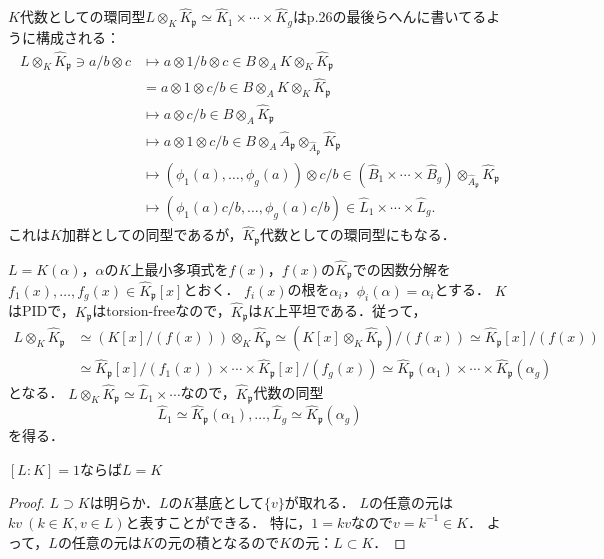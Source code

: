 $K$代数としての環同型$L\otimes_K\widehat{K}_\mathfrak{p}\simeq\widehat{K}_1\times\cdots\times\widehat{K}_g$はp.26の最後らへんに書いてるように構成される：
\begin{align*}
  L\otimes_K\widehat{K}_\mathfrak{p}\ni a/b\otimes c &\mapsto a\otimes1/b\otimes c\in B\otimes_AK\otimes_K\widehat{K}_\mathfrak{p}\\
  & =  a\otimes1\otimes c/b\in B\otimes_AK\otimes_K\widehat{K}_\mathfrak{p}\\
  &\mapsto a\otimes c/b\in B\otimes_A\widehat{K}_\mathfrak{p}\\
  &\mapsto a\otimes1\otimes c/b\in B\otimes_A\widehat{A}_\mathfrak{p}\otimes_{\widehat{A}_\mathfrak{p}}\widehat{K}_\mathfrak{p}\\
  &\mapsto (\phi_1(a), \ldots, \phi_g(a))\otimes c/b\in\left(\widehat{B}_1\times\cdots\times\widehat{B}_g\right)\otimes_{\widehat{A}_\mathfrak{p}}\widehat{K}_\mathfrak{p}\\
  &\mapsto (\phi_1(a)c/b, \ldots, \phi_g(a)c/b)\in\widehat{L}_1\times\cdots\times\widehat{L}_g.
\end{align*}
これは$K$加群としての同型であるが，$\widehat{K}_\mathfrak{p}$代数としての環同型にもなる．

$L = K(\alpha)$，$\alpha$の$K$上最小多項式を$f(x)$，$f(x)$の$\widehat{K}_\mathfrak{p}$での因数分解を$f_1(x), \ldots, f_g(x)\in\widehat{K}_\mathfrak{p}[x]$とおく．
$f_i(x)$の根を$\alpha_i$，$\phi_i(\alpha) = \alpha_i$とする．
$K$はPIDで，$K_\mathfrak{p}$はtorsion-freeなので，$\widehat{K}_\mathfrak{p}$は$K$上平坦である．従って，
\begin{align*}
  L\otimes_K\widehat{K}_\mathfrak{p} &\simeq \left(K[x]/(f(x))\right)\otimes_K\widehat{K}_\mathfrak{p} \simeq \left(K[x]\otimes_K\widehat{K}_\mathfrak{p}\right)/(f(x)) \simeq \widehat{K}_\mathfrak{p}[x]/(f(x)) \\
  &\simeq \widehat{K}_\mathfrak{p}[x]/(f_1(x))\times\cdots\times\widehat{K}_\mathfrak{p}[x]/(f_g(x)) \simeq \widehat{K}_\mathfrak{p}(\alpha_1)\times\cdots\times\widehat{K}_\mathfrak{p}(\alpha_g)
\end{align*}
となる．
$L\otimes_K\widehat{K}_\mathfrak{p}\simeq\widehat{L}_1\times\cdots$なので，$\widehat{K}_\mathfrak{p}$代数の同型
\[\widehat{L}_1\simeq\widehat{K}_\mathfrak{p}(\alpha_1), \ldots, \widehat{L}_g\simeq\widehat{K}_\mathfrak{p}(\alpha_g)\]
を得る．

\begin{screen}
  $[L:K] = 1$ならば$L = K$
\end{screen}
\begin{proof}
  $L\supset K$は明らか．$L$の$K$基底として$\{v\}$が取れる．
  $L$の任意の元は$kv\ (k\in K, v\in L)$と表すことができる．
  特に，$1 = kv$なので$v = k^{-1}\in K$．
  よって，$L$の任意の元は$K$の元の積となるので$K$の元：$L\subset K$．
\end{proof}

